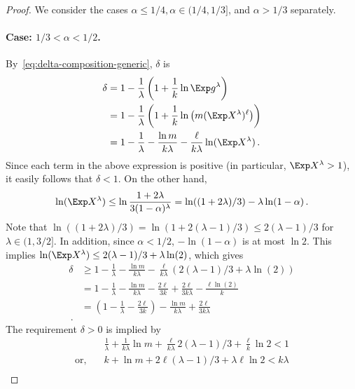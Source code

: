 \begin{proof}
We consider the cases $\alpha \leq 1/4, \alpha \in (1/4, 1/3]$, and $\alpha > 1/3$ separately.

\paragraph{Case: $1/3 < \alpha < 1/2$.}
By~\eqref{eq:delta-composition-generic}, $\delta$ is 
\begin{align*}
    \delta
    &= 1 - \frac{1}{\lambda}\left(1 + \frac{1}{k} \ln \Exp g^\lambda \right) \\
    &= 1 - \frac{1}{\lambda}\left(1 + \frac{1}{k} \ln \left( m (\Exp X^\lambda)^\ell\right) \right) \\
    &= 1 - \frac{1}{\lambda} - \frac{\ln m}{k \lambda} - \frac{\ell}{k \lambda} \ln (\Exp X^\lambda)
    \,.
\end{align*}
Since each term in the above expression is positive (in particular, $\Exp X^\lambda > 1$), 
it easily follows that $\delta < 1$. 
On the other hand, 
\[
    \ln (\Exp X^\lambda) \leq \ln \frac{1+2\lambda}{3(1-\alpha)^\lambda} = \ln ((1+2\lambda)/3) - \lambda \ln(1-\alpha)
    \,.
\]
Note that $\ln((1+2 \lambda)/3) = \ln(1+ 2(\lambda-1)/3) \leq 2(\lambda - 1)/3$ for $\lambda \in (1, 3/2]$. 
In addition, since $\alpha < 1/2$, $-\ln(1-\alpha)$ is at most $\ln 2$. 
This implies 
$
    \ln (\Exp X^\lambda) \leq 2(\lambda-1)/3 + \lambda \ln(2)
$, which gives
\begin{align*}
    \delta 
    &\geq 
        1 
        - \frac{1}{\lambda} 
        - \frac{\ln m}{k \lambda} 
        - \frac{\ell}{k \lambda} \left( 2(\lambda-1)/3 + \lambda \ln(2) \right) \\
   &=   1 
        - \frac{1}{\lambda} 
        - \frac{\ln m}{k \lambda} 
        - \frac{2\ell}{3k} +\frac{2\ell}{3 k\lambda} - \frac{\ell \ln(2)}{k} \\
   &=   \left(1 
        - \frac{1}{\lambda} 
        - \frac{2\ell}{3k} \right)
        - \frac{\ln m}{k \lambda} 
        +\frac{2\ell}{3 k\lambda} 
        \\
        \, .
\end{align*}
The requirement $\delta > 0$ is implied by
\begin{align*}
    &\frac{1}{\lambda} + 
    \frac{1}{k\lambda} \ln m + 
    \frac{\ell}{k\lambda} 2(\lambda - 1)/3 + 
    \frac{\ell}{k} \ln2 
    < 1 \\
    \text{or},\quad& k + \ln m + 2\ell(\lambda - 1)/3 + \lambda \ell \ln 2 < k\lambda \\

\end{align*}
\end{proof}
